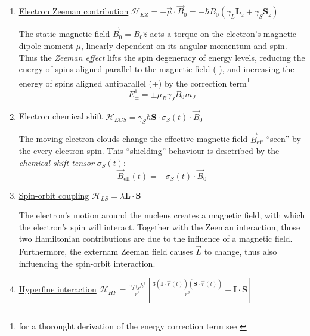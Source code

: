 \documentclass[11.5pt,a4paper]{article}
\begin{document}
\begin{enumerate}
  \item \uline{Electron Zeeman contribution} $\mathcal{H}_{EZ} = - \vec{\mu} \cdot \vec{B}_0 = -\hbar B_0 (\gamma_L \mathbf{L}_z + \gamma_S \mathbf{S}_z)$

  The static magnetic field $\vec{B}_0 = B_0 \hat{z}$ acts a torque on the electron's magnetic dipole moment $\mu$, linearly dependent on its angular momentum and spin. Thus the \emph{Zeeman effect} lifts the spin degeneracy of energy levels, reducing the energy of spins aligned parallel to the magnetic field (-), and increasing the energy of spins aligned antiparallel (+) by the correction term\footnote{for a thorought derivation of the energy correction term see \cite[chap. 6.4 The Zeeman Effect, p. 277ff]{griffiths}}
  \begin{equation}
   E^1_\pm = \pm \mu_B \gamma_J B_0 m_J 
  \end{equation}
  

  \item \uline{Electron chemical shift} $\mathcal{H}_{ECS} = \gamma_S \hbar \mathbf{S} \cdot \sigma_S(t) \cdot \vec{B}_0$
  
  The moving electron clouds change the effective magnetic field $\vec{B}_\text{eff}$ ``seen'' by the every electron spin. This ``shielding'' behaviour is desctribed by the \emph{chemical shift tensor} $\sigma_S(t)$:
  \begin{equation}
    \vec{B}_\text{eff}(t) = - \sigma_S(t) \cdot \vec{B}_0
  \end{equation}

  \item \uline{Spin-orbit coupling} $\mathcal{H}_{LS} = \lambda \mathbf{L}\cdot \mathbf{S}$

  The electron's motion around the nucleus creates a magnetic field, with which the electron's spin will interact. 
  Together with the Zeeman interaction, those two Hamiltonian contributions are due to the influence of a magnetic field. Furthermore, the externam Zeeman field causes $\vec{L}$ to change, thus also influencing the spin-orbit interaction.

  \item \uline{Hyperfine interaction} $\mathcal{H}_{HF} = \frac{\gamma_I \gamma_S \hbar^2}{r^3} \left[ \frac{3 (\mathbf{I} \cdot \vec{r}(t) ) (\mathbf{S} \cdot \vec{r}(t) )}{r^2} - \mathbf{I} \cdot \mathbf{S} \right]$
   

\end{enumerate}
\end{document}
